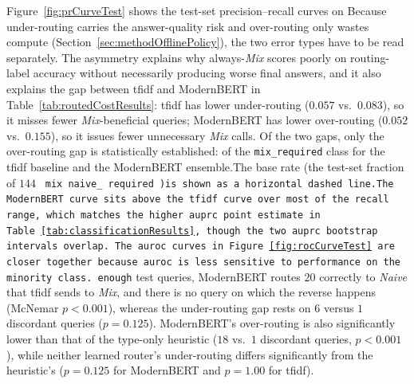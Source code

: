 \documentclass[english, bibtex]{kththesis}               %
\numberwithin{listing}{chapter}
\providecommand{\DIFaddtex}[1]{{\protect\color{blue} \sf #1}} %
\providecommand{\DIFdeltex}[1]{{\protect\color{red} \scriptsize #1}} %
\providecommand{\DIFaddbegin}{} %
\providecommand{\DIFaddend}{} %
\providecommand{\DIFdelbegin}{} %
\providecommand{\DIFdelend}{} %
\providecommand{\DIFadd}[1]{\texorpdfstring{\DIFaddtex{#1}}{#1}} %
\providecommand{\DIFdel}[1]{\texorpdfstring{\DIFdeltex{#1}}{}} %
\begin{document}
\DIFdelbegin \DIFdel{Figure~\ref{fig:prCurveTest} shows the test-set precision--recall curves on }\DIFdelend \DIFaddbegin \DIFadd{Because under-routing carries the answer-quality risk and over-routing only wastes compute (Section~\ref{sec:methodOfflinePolicy}), the two error types have to be read separately. The asymmetry explains why always-\emph{Mix} scores poorly on routing-label accuracy without necessarily producing worse final answers, and it also explains the gap between \gls{tfidf} and ModernBERT in Table~\ref{tab:routedCostResults}: \gls{tfidf} has lower under-routing ($0.057$ vs.\ $0.083$), so it misses fewer \emph{Mix}-beneficial queries; ModernBERT has lower over-routing ($0.052$ vs.\ $0.155$), so it issues fewer unnecessary \emph{Mix} calls. Of the two gaps, only the over-routing gap is statistically established: of }\DIFaddend the \DIFdelbegin \DIFdel{\texttt{mix\_required} class for the \gls{tfidf} baseline and the ModernBERT ensemble.The base rate (the test-set fraction of }\DIFdelend \DIFaddbegin \DIFadd{$144$ }\DIFaddend \texttt{\DIFdelbegin \DIFdel{mix}\DIFdelend \DIFaddbegin \DIFadd{naive}\DIFaddend \_\DIFdelbegin \DIFdel{required}%
\DIFdel{)is shown as a horizontal dashed line.The ModernBERT curve sits above the \gls{tfidf} curve over most of the recall range, which matches the higher \gls{auprc} point estimate in Table~\ref{tab:classificationResults}, though the two \gls{auprc} bootstrap intervals overlap.
The \gls{auroc} curves in Figure~\ref{fig:rocCurveTest} are closer together because \gls{auroc} is less sensitive to performance on the minority class. }\DIFdelend \DIFaddbegin \DIFadd{enough}} \DIFadd{test queries, ModernBERT routes $20$ correctly to \emph{Naive} that \gls{tfidf} sends to \emph{Mix}, and there is no query on which the reverse happens (McNemar $p < 0.001$), whereas the under-routing gap rests on $6$ versus $1$ discordant queries ($p = 0.125$). ModernBERT's over-routing is also significantly lower than that of the type-only heuristic ($18$ vs.\ $1$ discordant queries, $p < 0.001$), while neither learned router's under-routing differs significantly from the heuristic's ($p = 0.125$ for ModernBERT and $p = 1.00$ for \gls{tfidf}).
}\DIFaddend 
\end{document}
